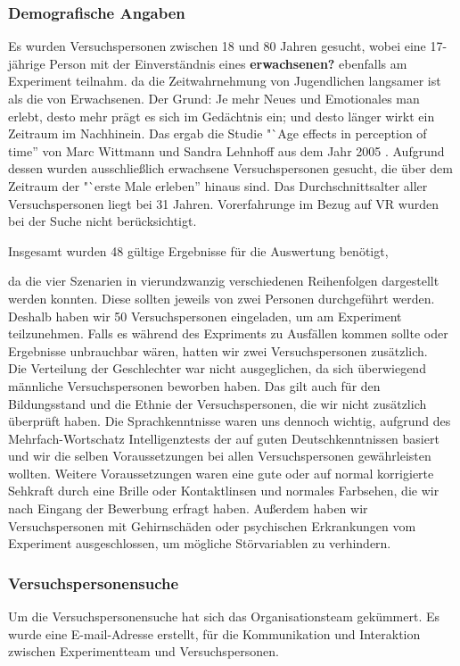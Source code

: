 \documentclass{Bericht}
\begin{document}
\subsubsection{Demografische Angaben}
Es wurden Versuchspersonen zwischen 18 und 80 Jahren gesucht, wobei eine 17-jährige Person mit der Einverständnis eines \textbf{erwachsenen?} ebenfalls am Experiment teilnahm. 
da die Zeitwahrnehmung von Jugendlichen langsamer ist als die von Erwachsenen. Der Grund: Je mehr Neues und Emotionales man erlebt, desto mehr prägt es sich im Gedächtnis ein; und desto länger wirkt ein Zeitraum im Nachhinein. Das ergab die Studie "`Age effects in perception of time'' von Marc Wittmann und Sandra Lehnhoff aus dem Jahr 2005 \cite{AgeEffects}. Aufgrund dessen wurden ausschließlich erwachsene Versuchspersonen gesucht, die über dem Zeitraum der "`erste Male erleben'' hinaus sind. Das Durchschnittsalter aller Versuchspersonen liegt bei 31 Jahren. Vorerfahrunge im Bezug auf VR wurden bei der Suche nicht berücksichtigt.

Insgesamt wurden 48 gültige Ergebnisse für die Auswertung benötigt, 

da die vier Szenarien in vierundzwanzig verschiedenen Reihenfolgen dargestellt werden konnten. Diese sollten jeweils von zwei Personen durchgeführt werden. Deshalb haben wir 50 Versuchspersonen eingeladen, um am Experiment teilzunehmen. Falls es während des Expriments zu Ausfällen kommen sollte oder Ergebnisse unbrauchbar wären, hatten wir zwei Versuchspersonen zusätzlich. \\

Die Verteilung der Geschlechter war nicht ausgeglichen, da sich überwiegend männliche Versuchspersonen beworben haben. Das gilt auch für den Bildungsstand und die Ethnie der Versuchspersonen, die wir nicht zusätzlich überprüft haben. Die Sprachkenntnisse waren uns dennoch wichtig, aufgrund des Mehrfach-Wortschatz Intelligenztests der auf guten Deutschkenntnissen basiert und wir die selben Voraussetzungen bei allen Versuchspersonen gewährleisten wollten. Weitere Voraussetzungen waren eine gute oder auf normal korrigierte Sehkraft durch eine Brille oder Kontaktlinsen und normales Farbsehen, die wir nach Eingang der Bewerbung erfragt haben. Außerdem haben wir Versuchspersonen mit Gehirnschäden oder psychischen Erkrankungen vom Experiment ausgeschlossen, um mögliche Störvariablen zu verhindern. 

\subsubsection{Versuchspersonensuche}
Um die Versuchspersonensuche hat sich das Organisationsteam gekümmert.
 Es wurde eine E-mail-Adresse erstellt, für die Kommunikation und Interaktion zwischen Experimentteam und Versuchspersonen. 
 
\end{document}
